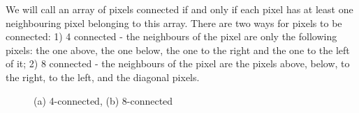 \documentclass[12pt,a4paper,oneside,titlepage]{article}
\begin{document}
We will call an array of pixels connected if and only if each pixel has at least one neighbouring pixel belonging to this array.
There are two ways for pixels to be connected:
1) 4 connected - the neighbours of the pixel are only the following pixels: the one above, the one below, the one to the right and the one to the left of it;
2) 8 connected - the neighbours of the pixel are the pixels above, below, to the right, to the left, and the diagonal pixels.




\begin{figure}[h]
\begin{minipage}[h]{0.49\linewidth}
\end{minipage}
\hfill
\begin{minipage}[h]{0.49\linewidth}
\end{minipage}
\caption{(a) 4-connected, (b) 8-connected}
\label{ris:image1}
\end{figure}
\end{document}
